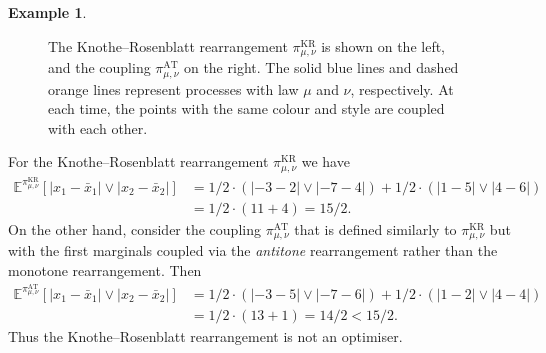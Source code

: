 \documentclass[oneside]{amsart}
\theoremstyle{definition}
\newtheorem{example}[theorem]{Example}
\newcommand{\kr}{\mathrm{KR}}
\newcommand{\antitone}{\mathrm{AT}}
\def\E{{\mathbb E}}
\numberwithin{equation}{section}
\begin{document}
\begin{example}
\begin{figure}[h]
				\caption{The Knothe--Rosenblatt rearrangement $\pi^\kr_{\mu, \nu}$ is shown on the left, and the coupling $\pi^\antitone_{\mu, \nu}$ on the right. The solid blue lines and dashed orange lines represent processes with law $\mu$ and $\nu$, respectively. At each time, the points with the same colour and style are coupled with each other.}
				\label{fig:counterexample}
			\end{figure}
			For the Knothe--Rosenblatt rearrangement $\pi^\kr_{\mu, \nu}$ we have
			\begin{equation}
				\begin{split}
					\E^{\pi^\kr_{\mu, \nu}}\!\left[|x_1 - \bar x_1| \vee |x_2 - \bar x_2|\right] & = 1/2 \cdot (|- 3 - 2| \vee |- 7 - 4|) + 1/2 \cdot (|1 - 5| \vee |4 - 6|)\\
					& = 1/2 \cdot (11 + 4) = 15/2.
				\end{split}
			\end{equation}
			On the other hand, consider the coupling $\pi^\antitone_{\mu, \nu}$ that is defined similarly to $\pi^\kr_{\mu, \nu}$ but with the first marginals coupled via the \emph{antitone} rearrangement rather than the monotone rearrangement. Then
			\begin{equation}
				\begin{split}
					\E^{\pi^\antitone_{\mu, \nu}}\!\left[|x_1 - \bar x_1| \vee |x_2 - \bar x_2|\right] & = 1/2 \cdot (|- 3 - 5| \vee |- 7 - 6|) + 1/2 \cdot (|1 - 2| \vee |4 - 4|)\\
					& = 1/2 \cdot (13 + 1) = 14/2 < 15/2.
				\end{split}
			\end{equation}
			Thus the Knothe--Rosenblatt rearrangement is not an optimiser.
			

\end{example}
\end{document}

